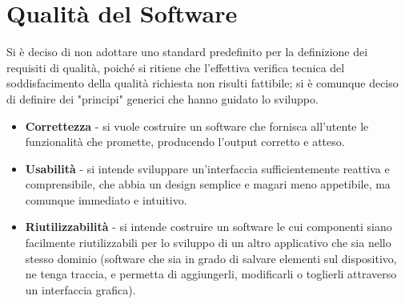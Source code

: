 \documentclass{article}
\begin{document}
\section{Qualità del Software}
Si è deciso di non adottare uno standard predefinito per la definizione dei requisiti di qualità, poiché si ritiene che l'effettiva verifica tecnica del soddisfacimento della qualità richiesta non risulti fattibile; si è comunque deciso di definire dei "principi" generici che hanno guidato lo sviluppo.

\begin{itemize}
    \item \textbf{Correttezza} - si vuole costruire un software che fornisca all'utente le funzionalità che promette, producendo l'output corretto e atteso.
    \item \textbf{Usabilità} - si intende sviluppare un'interfaccia sufficientemente reattiva e comprensibile, che abbia un design semplice e magari meno appetibile, ma comunque immediato e intuitivo. 
    \item \textbf{Riutilizzabilità} - si intende costruire un software le cui componenti siano facilmente riutilizzabili per lo sviluppo di un altro applicativo che sia nello stesso dominio (software che sia in grado di salvare elementi sul dispositivo, ne tenga traccia, e permetta di aggiungerli, modificarli o toglierli attraverso un interfaccia grafica).
\end{itemize}
\end{document}
